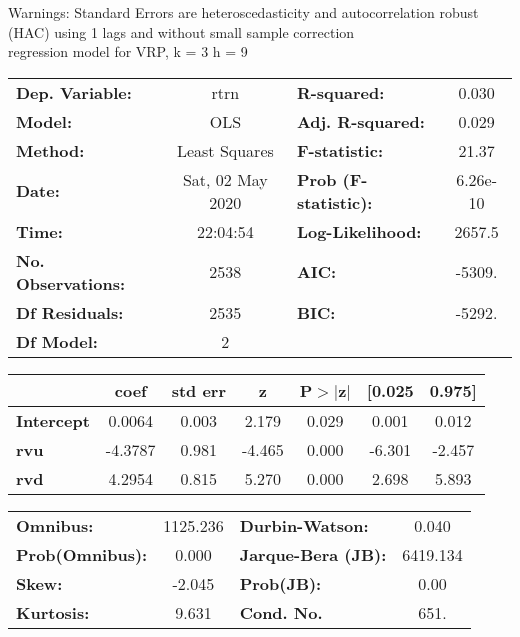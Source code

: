 Warnings: \newline
 [1] Standard Errors are heteroscedasticity and autocorrelation robust (HAC) using 1 lags and without small sample correction\\ 

regression model for VRP, k = 3 h = 9\begin{center}
\begin{tabular}{lclc}
\toprule
\textbf{Dep. Variable:}    &       rtrn       & \textbf{  R-squared:         } &     0.030   \\
\textbf{Model:}            &       OLS        & \textbf{  Adj. R-squared:    } &     0.029   \\
\textbf{Method:}           &  Least Squares   & \textbf{  F-statistic:       } &     21.37   \\
\textbf{Date:}             & Sat, 02 May 2020 & \textbf{  Prob (F-statistic):} &  6.26e-10   \\
\textbf{Time:}             &     22:04:54     & \textbf{  Log-Likelihood:    } &    2657.5   \\
\textbf{No. Observations:} &        2538      & \textbf{  AIC:               } &    -5309.   \\
\textbf{Df Residuals:}     &        2535      & \textbf{  BIC:               } &    -5292.   \\
\textbf{Df Model:}         &           2      & \textbf{                     } &             \\
\bottomrule
\end{tabular}
\begin{tabular}{lcccccc}
                   & \textbf{coef} & \textbf{std err} & \textbf{z} & \textbf{P$> |$z$|$} & \textbf{[0.025} & \textbf{0.975]}  \\
\midrule
\textbf{Intercept} &       0.0064  &        0.003     &     2.179  &         0.029        &        0.001    &        0.012     \\
\textbf{rvu}       &      -4.3787  &        0.981     &    -4.465  &         0.000        &       -6.301    &       -2.457     \\
\textbf{rvd}       &       4.2954  &        0.815     &     5.270  &         0.000        &        2.698    &        5.893     \\
\bottomrule
\end{tabular}
\begin{tabular}{lclc}
\textbf{Omnibus:}       & 1125.236 & \textbf{  Durbin-Watson:     } &    0.040  \\
\textbf{Prob(Omnibus):} &   0.000  & \textbf{  Jarque-Bera (JB):  } & 6419.134  \\
\textbf{Skew:}          &  -2.045  & \textbf{  Prob(JB):          } &     0.00  \\
\textbf{Kurtosis:}      &   9.631  & \textbf{  Cond. No.          } &     651.  \\
\bottomrule
\end{tabular}
\end{center}

